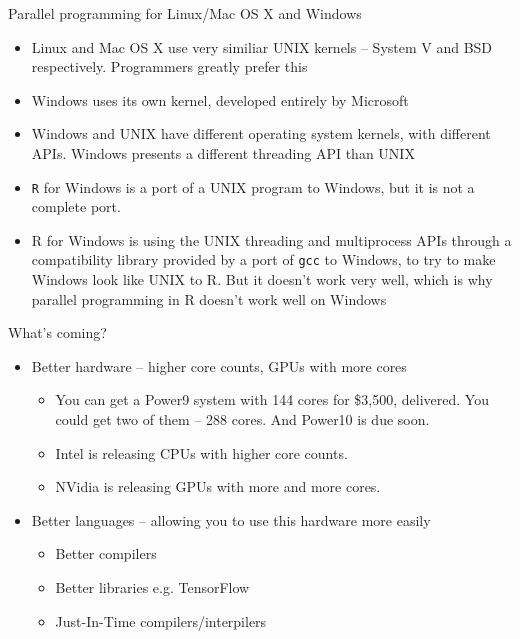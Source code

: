 \documentclass{beamer}
\begin{document}
\begin{frame}{Parallel programming for Linux/Mac OS X and Windows}
	\begin{itemize}
		\item Linux and Mac OS X use very similiar UNIX kernels -- System V and BSD respectively. Programmers greatly prefer this
		\item Windows uses its own kernel, developed entirely by Microsoft
		\item Windows and UNIX have different operating system kernels, with different APIs. Windows presents a different threading API than UNIX
		\item \texttt{R} for Windows is a port of a UNIX program to Windows, but it is not a complete port.
		\item R for Windows is using the UNIX threading and multiprocess APIs through a compatibility library provided by a port of \texttt{gcc} to Windows, to try to make Windows look like UNIX to R.  But it doesn't work very well, which is why parallel programming in R doesn't work well on Windows
	\end{itemize}
\end{frame}

\begin{frame}{What's coming?}
	\begin{itemize}
		\item Better hardware -- higher core counts, GPUs with more cores
			\begin{itemize}
				\item You can get a Power9 system with 144 cores for \$3,500, delivered.  You could get two of them -- 288 cores. And Power10 is due soon.
				\item Intel is releasing CPUs with higher core counts.
				\item NVidia is releasing GPUs with more and more cores.
			\end{itemize}

		\item Better languages -- allowing you to use this hardware more easily
			\begin{itemize}
				\item Better compilers
				\item Better libraries e.g. TensorFlow
				\item Just-In-Time compilers/interpilers
			\end{itemize}
	\end{itemize}
\end{frame}
\end{document}
